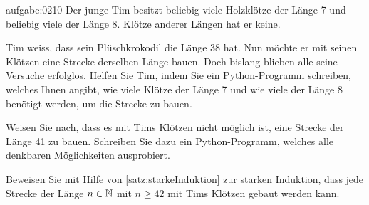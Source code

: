 \begin{aufgabe}{aufgabe:0210}
Der junge Tim besitzt beliebig viele Holzklötze der Länge 7 und beliebig viele der Länge 8. Klötze anderer Längen hat er keine.
\begin{aenum}
    \item Tim weiss, dass sein Plüschkrokodil die Länge 38 hat. Nun möchte er mit seinen Klötzen eine Strecke derselben Länge bauen. Doch bislang blieben alle seine Versuche erfolglos. Helfen Sie Tim, indem Sie ein Python-Programm schreiben, welches Ihnen angibt, wie viele Klötze der Länge 7 und wie viele der Länge 8 benötigt werden, um die Strecke zu bauen.
    \item Weisen Sie nach, dass es mit Tims Klötzen nicht möglich ist, eine Strecke der Länge 41 zu bauen. Schreiben Sie dazu ein Python-Programm, welches alle denkbaren Möglichkeiten ausprobiert.
    \item Beweisen Sie mit Hilfe von \cref{satz:starkeInduktion} zur starken Induktion, dass jede Strecke der Länge $n\in\mathbb{N}$ mit $n\geq 42$ mit Tims Klötzen gebaut werden kann.
\end{aenum}
\end{aufgabe}

